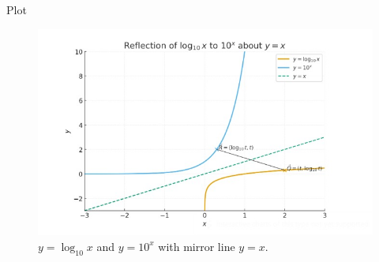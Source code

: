 \documentclass{beamer}
\theoremstyle{remark}
\begin{document}
\begin{frame}{Plot}
    \begin{figure}[H]
    \centering
    \includegraphics[width=0.8\linewidth]{figs/matgeo-4.13.4.jpeg}
    \caption{$y=\log_{10}x$ and $y=10^{x}$ with mirror line $y=x$.}
    \label{fig:4.13.4}
\end{figure}
\end{frame}
\end{document}
